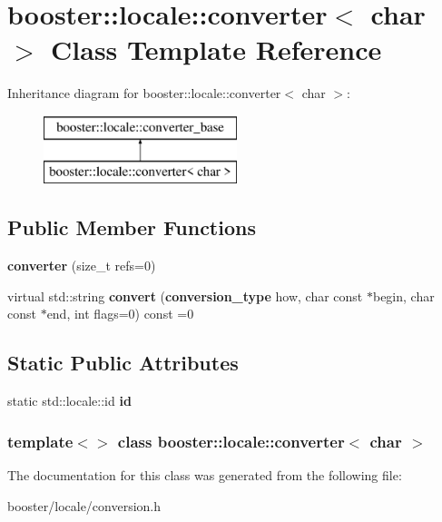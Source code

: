 \section{booster\-:\-:locale\-:\-:converter$<$ char $>$ \-Class \-Template \-Reference}
\label{classbooster_1_1locale_1_1converter_3_01char_01_4}
\-Inheritance diagram for booster\-:\-:locale\-:\-:converter$<$ char $>$\-:\begin{figure}[H]
\begin{center}
\leavevmode
\includegraphics[height=2.000000cm]{classbooster_1_1locale_1_1converter_3_01char_01_4}
\end{center}
\end{figure}
\subsection*{\-Public \-Member \-Functions}
\begin{DoxyCompactItemize}
\item 
{\bfseries converter} (size\-\_\-t refs=0)\label{classbooster_1_1locale_1_1converter_3_01char_01_4_a0fe9bcea296deda0ed9217b09de2a862}

\item 
virtual std\-::string {\bfseries convert} ({\bf conversion\-\_\-type} how, char const $\ast$begin, char const $\ast$end, int flags=0) const =0\label{classbooster_1_1locale_1_1converter_3_01char_01_4_a5ef2642c11c137cb9d93368ae76b5792}

\end{DoxyCompactItemize}
\subsection*{\-Static \-Public \-Attributes}
\begin{DoxyCompactItemize}
\item 
static std\-::locale\-::id {\bfseries id}\label{classbooster_1_1locale_1_1converter_3_01char_01_4_a5a14a4e6600b6eae8b7ff2ea01b16a94}

\end{DoxyCompactItemize}
\subsubsection*{template$<$$>$ class booster\-::locale\-::converter$<$ char $>$}



\-The documentation for this class was generated from the following file\-:\begin{DoxyCompactItemize}
\item 
booster/locale/conversion.\-h\end{DoxyCompactItemize}
